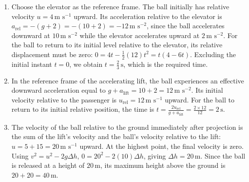\documentclass[11pt,a4paper]{article}
\begin{document}
\begin{enumerate}
\item Choose the elevator as the reference frame. The ball initially has relative velocity $u=4\,\text{m s}^{-1}$ upward. Its acceleration relative to the elevator is $a_{\text{rel}}=-(g+2)=-(10+2)=-12\,\text{m s}^{-2}$, since the ball accelerates downward at $10\,\text{m s}^{-2}$ while the elevator accelerates upward at $2\,\text{m s}^{-2}$. For the ball to return to its initial level relative to the elevator, its relative displacement must be zero: $0=4t-\frac{1}{2}(12)t^2=t(4-6t)$. Excluding the initial instant $t=0$, we obtain $t=\frac{2}{3}\,\text{s}$, which is the required time.
\item In the reference frame of the accelerating lift, the ball experiences an effective downward acceleration equal to $g+a_{\text{lift}}=10+2=12\,\text{m s}^{-2}$. Its initial velocity relative to the passenger is $u_{\text{rel}}=12\,\text{m s}^{-1}$ upward. For the ball to return to its initial relative position, the time is $t=\frac{2u_{\text{rel}}}{g+a_{\text{lift}}}=\frac{2\times12}{12}=2\,\text{s}$.
\item The velocity of the ball relative to the ground immediately after projection is the sum of the lift's velocity and the ball's velocity relative to the lift: \(u=5+15=20\,\text{m s}^{-1}\) upward. At the highest point, the final velocity is zero. Using \(v^2=u^2-2g\Delta h\), \(0=20^2-2(10)\Delta h\), giving \(\Delta h=20\,\text{m}\). Since the ball is released at a height of \(20\,\text{m}\), its maximum height above the ground is \(20+20=40\,\text{m}\).
\end{enumerate}
\end{document}
